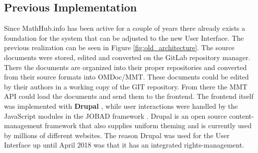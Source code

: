 \documentclass[11pt,a4paper]{article}
\begin{document}
\subsection{Previous Implementation} \label{previous}
Since MathHub.info has been active for a couple of years there already exists a foundation for the system that can be adjusted to the new User Interface.
The previous realization can be seen in Figure \ref{fig:old_architecture}.
The source documents were stored, edited and converted on the GitLab repository manager.
There the documents are organized into their proper repositories and converted from their source formats into OMDoc/MMT.
These documents could be edited by their authors in a working copy of the GIT repository.
From there the MMT API could load the documents and send them to the frontend.
The frontend itself was implemented with \textbf{Drupal} \cite{comp}, while user interactions were handled by the JavaScript modules in the JOBAD framework \cite{jobad}.
Drupal is an open source content-management framework that also supplies uniform theming and is currently used by millions of different websites.
The reason Drupal was used for the User Interface up until April 2018 was that it has an integrated rights-management.
\end{document}
